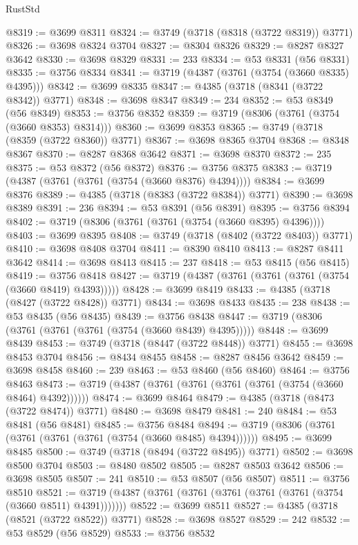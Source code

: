 \begin{lexlean}{RustStd}
\begin{coremodule}
{\begin{coremodule}
{{{{{{{{{{{{{{{{{{{{{{{{{{{{{{{{{{{{{{{{{{{{{{{@8319 := @3699 @8311
@8324 := @3749 (@3718 (@8318 (@3722 @8319)) @3771)
@8326 := @3698 @8324 @3704
@8327 := @8304 @8326
@8329 := @8287 @8327 @3642
@8330 := @3698 @8329
@8331 := 233
@8334 := @53 @8331 (@56 @8331)
@8335 := @3756 @8334
@8341 := @3719 (@4387 (@3761 (@3754 (@3660 @8335) @4395)))
@8342 := @3699 @8335
@8347 := @4385 (@3718 (@8341 (@3722 @8342)) @3771)
@8348 := @3698 @8347
@8349 := 234
@8352 := @53 @8349 (@56 @8349)
@8353 := @3756 @8352
@8359 := @3719 (@8306 (@3761 (@3754 (@3660 @8353) @8314)))
@8360 := @3699 @8353
@8365 := @3749 (@3718 (@8359 (@3722 @8360)) @3771)
@8367 := @3698 @8365 @3704
@8368 := @8348 @8367
@8370 := @8287 @8368 @3642
@8371 := @3698 @8370
@8372 := 235
@8375 := @53 @8372 (@56 @8372)
@8376 := @3756 @8375
@8383 := @3719 (@4387 (@3761 (@3761 (@3754 (@3660 @8376) @4394))))
@8384 := @3699 @8376
@8389 := @4385 (@3718 (@8383 (@3722 @8384)) @3771)
@8390 := @3698 @8389
@8391 := 236
@8394 := @53 @8391 (@56 @8391)
@8395 := @3756 @8394
@8402 := @3719 (@8306 (@3761 (@3761 (@3754 (@3660 @8395) @4396))))
@8403 := @3699 @8395
@8408 := @3749 (@3718 (@8402 (@3722 @8403)) @3771)
@8410 := @3698 @8408 @3704
@8411 := @8390 @8410
@8413 := @8287 @8411 @3642
@8414 := @3698 @8413
@8415 := 237
@8418 := @53 @8415 (@56 @8415)
@8419 := @3756 @8418
@8427 := @3719 (@4387 (@3761 (@3761 (@3761 (@3754 (@3660 @8419) @4393)))))
@8428 := @3699 @8419
@8433 := @4385 (@3718 (@8427 (@3722 @8428)) @3771)
@8434 := @3698 @8433
@8435 := 238
@8438 := @53 @8435 (@56 @8435)
@8439 := @3756 @8438
@8447 := @3719 (@8306 (@3761 (@3761 (@3761 (@3754 (@3660 @8439) @4395)))))
@8448 := @3699 @8439
@8453 := @3749 (@3718 (@8447 (@3722 @8448)) @3771)
@8455 := @3698 @8453 @3704
@8456 := @8434 @8455
@8458 := @8287 @8456 @3642
@8459 := @3698 @8458
@8460 := 239
@8463 := @53 @8460 (@56 @8460)
@8464 := @3756 @8463
@8473 := @3719 (@4387 (@3761 (@3761 (@3761 (@3761 (@3754 (@3660 @8464) @4392))))))
@8474 := @3699 @8464
@8479 := @4385 (@3718 (@8473 (@3722 @8474)) @3771)
@8480 := @3698 @8479
@8481 := 240
@8484 := @53 @8481 (@56 @8481)
@8485 := @3756 @8484
@8494 := @3719 (@8306 (@3761 (@3761 (@3761 (@3761 (@3754 (@3660 @8485) @4394))))))
@8495 := @3699 @8485
@8500 := @3749 (@3718 (@8494 (@3722 @8495)) @3771)
@8502 := @3698 @8500 @3704
@8503 := @8480 @8502
@8505 := @8287 @8503 @3642
@8506 := @3698 @8505
@8507 := 241
@8510 := @53 @8507 (@56 @8507)
@8511 := @3756 @8510
@8521 := @3719 (@4387 (@3761 (@3761 (@3761 (@3761 (@3761 (@3754 (@3660 @8511) @4391)))))))
@8522 := @3699 @8511
@8527 := @4385 (@3718 (@8521 (@3722 @8522)) @3771)
@8528 := @3698 @8527
@8529 := 242
@8532 := @53 @8529 (@56 @8529)
@8533 := @3756 @8532
}}}}}}}}}}}}}}}}}}}}}}}}}}}}}}}}}}}}}}}}}}}}}}}
\end{coremodule}}
\end{coremodule}
\end{lexlean}
